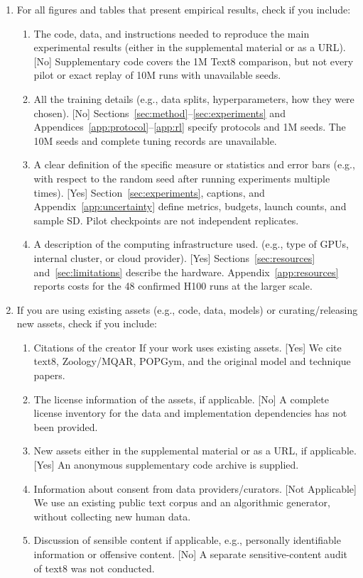 \begin{enumerate}
  \item For all figures and tables that present empirical results, check if you include:
  \begin{enumerate}
    \item The code, data, and instructions needed to reproduce the main experimental results (either in the supplemental material or as a URL). [No] Supplementary code covers the 1M Text8 comparison, but not every pilot or exact replay of 10M runs with unavailable seeds.
    \item All the training details (e.g., data splits, hyperparameters, how they were chosen). [No] Sections~\ref{sec:method}--\ref{sec:experiments} and Appendices~\ref{app:protocol}--\ref{app:rl} specify protocols and 1M seeds. The 10M seeds and complete tuning records are unavailable.
    \item A clear definition of the specific measure or statistics and error bars (e.g., with respect to the random seed after running experiments multiple times). [Yes] Section~\ref{sec:experiments}, captions, and Appendix~\ref{app:uncertainty} define metrics, budgets, launch counts, and sample SD. Pilot checkpoints are not independent replicates.
    \item A description of the computing infrastructure used. (e.g., type of GPUs, internal cluster, or cloud provider). [Yes] Sections~\ref{sec:resources} and~\ref{sec:limitations} describe the hardware. Appendix~\ref{app:resources} reports costs for the 48 confirmed H100 runs at the larger scale.
  \end{enumerate}

  \item If you are using existing assets (e.g., code, data, models) or curating/releasing new assets, check if you include:
  \begin{enumerate}
    \item Citations of the creator If your work uses existing assets. [Yes] We cite text8, Zoology/MQAR, POPGym, and the original model and technique papers.
    \item The license information of the assets, if applicable. [No] A complete license inventory for the data and implementation dependencies has not been provided.
    \item New assets either in the supplemental material or as a URL, if applicable. [Yes] An anonymous supplementary code archive is supplied.
    \item Information about consent from data providers/curators. [Not Applicable] We use an existing public text corpus and an algorithmic generator, without collecting new human data.
    \item Discussion of sensible content if applicable, e.g., personally identifiable information or offensive content. [No] A separate sensitive-content audit of text8 was not conducted.
  \end{enumerate}


\end{enumerate}
